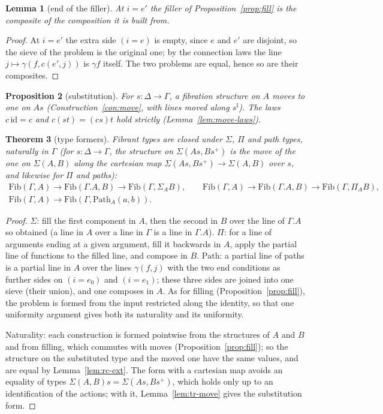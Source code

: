 \documentclass[11pt]{article}
\newcommand{\I}{\mathbb{I}}
\newcommand{\Fib}{\mathrm{Fib}}
\newcommand{\Path}{\mathrm{Path}}
\newcommand{\id}{\mathrm{id}}
\theoremstyle{plain}
\newtheorem{theorem}{Theorem}[section]
\newtheorem{lemma}[theorem]{Lemma}
\newtheorem{proposition}[theorem]{Proposition}
\theoremstyle{definition}
\theoremstyle{remark}
\begin{document}
\begin{lemma}[end of the filler]\label{lem:fill-end}
At $i=e'$ the filler of Proposition~\ref{prop:fill} is the composite of
the composition it is built from.
\end{lemma}

\begin{proof}
At $i=e'$ the extra side $(i=e)$ is empty, since $e$ and $e'$ are
disjoint, so the sieve of the problem is the original one; by the
connection laws the line $j\mapsto\gamma(f,c(e',j))$ is $\gamma f$
itself. The two problems are equal, hence so are their composites.
\end{proof}

\begin{proposition}[substitution]
For $s:\Delta\to\Gamma$, a fibration structure on $A$ moves to one on
$As$ (Construction~\ref{con:move}, with lines moved along $s^\I$).
The laws $c\,\id=c$ and $c(st)=(cs)t$ hold strictly
(Lemma~\ref{lem:move-laws}).
\end{proposition}

\begin{theorem}[type formers]\label{thm:formers}
Fibrant types are closed under $\Sigma$, $\Pi$ and path types, naturally
in $\Gamma$ (for $s:\Delta\to\Gamma$, the structure on $\Sigma(As,Bs^+)$
is the move of the one on $\Sigma(A,B)$ along the cartesian map
$\Sigma(As,Bs^+)\to\Sigma(A,B)$ over $s$, and likewise for $\Pi$ and
paths):
\begin{gather*}
\Fib(\Gamma,A)\to\Fib(\Gamma.A,B)\to\Fib(\Gamma,\Sigma_AB),\qquad
\Fib(\Gamma,A)\to\Fib(\Gamma.A,B)\to\Fib(\Gamma,\Pi_AB),\\
\Fib(\Gamma,A)\to\Fib(\Gamma,\Path_A(a,b)).
\end{gather*}
\end{theorem}

\begin{proof}
$\Sigma$: fill the first component in $A$, then the second in $B$ over
the line of $\Gamma.A$ so obtained (a line in $A$ over a line in $\Gamma$
is a line in $\Gamma.A$). $\Pi$: for a line of arguments ending at a
given argument, fill it backwards in $A$, apply the partial line of
functions to the filled line, and compose in $B$. $\Path$: a partial line
of paths is a partial line in $A$ over the lines $\gamma(f,j)$ with the
two end conditions as further sides on $(i=e_0)$ and $(i=e_1)$; these
three sides are joined into one sieve (their union), and one composes in
$A$. As for filling (Proposition~\ref{prop:fill}), the problem is formed
from the input restricted along the identity, so that one uniformity
argument gives both its naturality and its uniformity.

Naturality: each construction is formed pointwise from the structures
of $A$ and $B$ and from filling, which commutes with moves
(Proposition~\ref{prop:fill}); so the structure on the substituted type
and the moved one have the same values, and are equal by
Lemma~\ref{lem:rc-ext}. The form with a cartesian map avoids an equality
of types $\Sigma(A,B)s=\Sigma(As,Bs^+)$, which holds only up to an
identification of the actions; with it, Lemma~\ref{lem:tr-move} gives the
substitution form.
\end{proof}
\end{document}
